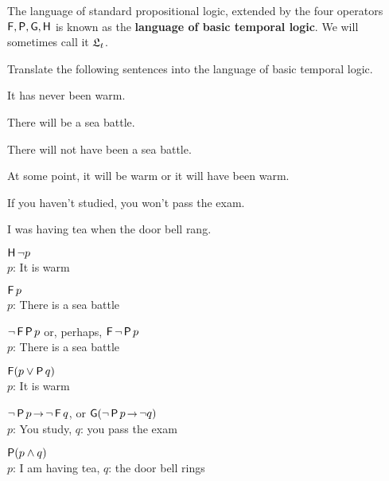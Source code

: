 The language of standard propositional logic, extended by the four operators
$\operatorname{\mathsf{F}},\operatorname{\mathsf{P}},\operatorname{\mathsf{G}},\operatorname{\mathsf{H}}$ is known as the \textbf{language of basic temporal logic}. We
will sometimes call it $\mathfrak{L}_t$.


\begin{exercise}
  Translate the following sentences into the language of basic temporal logic.
  \begin{exlist}
  \item It has never been warm. %
  \item There will be a sea battle. %
  \item There will not have been a sea battle. %
  \item At some point, it will be warm or it will have been warm. %
  \item If you haven't studied, you won't pass the exam. %
  \item I was having tea when the door bell rang. %
  \end{exlist}
  \vspace{-2mm}
\end{exercise}
\begin{solution}
  \begin{sollist}
  \item $\operatorname{\mathsf{H}} \neg p$\\
    $p$: It is warm\\[-2mm]
  \item $\operatorname{\mathsf{F}} p$\\
    $p$: There is a sea battle\\[-2mm]
  \item $\neg \operatorname{\mathsf{F}} \operatorname{\mathsf{P}} p$ or, perhaps, $\operatorname{\mathsf{F}}\neg \operatorname{\mathsf{P}} p$\\
    $p$: There is a sea battle\\[-2mm]
  \item  $\operatorname{\mathsf{F}}(p \lor \operatorname{\mathsf{P}} q)$\\
    $p$: It is warm\\[-2mm]
  \item $\neg \tP p \to \neg \tF q$, or $\tG(\neg\tP p \to \neg q)$\\
    $p$: You study, $q$: you pass the exam\\[-2mm]
  \item $\operatorname{\mathsf{P}}(p \land q)$\\
    $p$: I am having tea, $q$: the door bell rings
  \end{sollist}
\end{solution}


